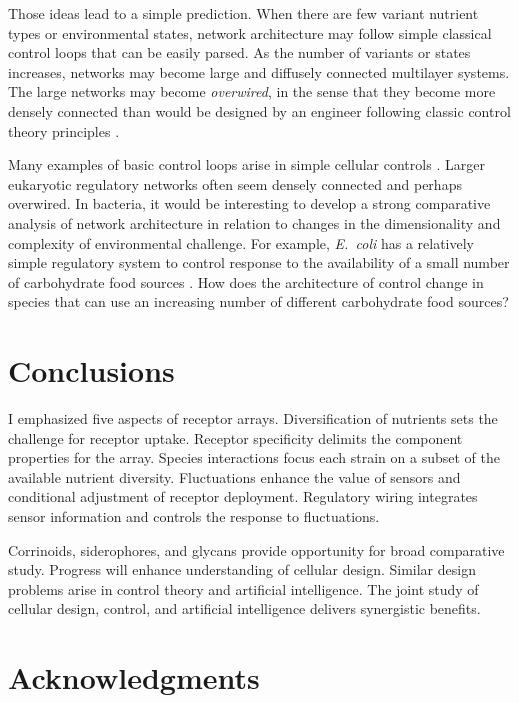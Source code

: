 \documentclass[\mydocfontsize]{article}
\begin{document}
\begin{multicols}{2}
Those ideas lead to a simple prediction. When there are few variant nutrient types or environmental states, network architecture may follow simple classical control loops that can be easily parsed. As the number of variants or states increases, networks may become large and diffusely connected multilayer systems. The large networks may become \textit{overwired}, in the sense that they become more densely connected than would be designed by an engineer following classic control theory principles \autocite{frank17puzzles5}.

Many examples of basic control loops arise in simple cellular controls \autocite{alon07an-introduction,09control,somvanshi15implementation}. Larger eukaryotic regulatory networks often seem densely connected and perhaps overwired. In bacteria, it would be interesting to develop a strong comparative analysis of network architecture in relation to changes in the dimensionality and complexity of environmental challenge. For example, \textit{E.\ coli} has a relatively simple regulatory system to control response to the availability of a small number of carbohydrate food sources \autocite{kochanowski17few-regulatory}. How does the architecture of control change in species that can use an increasing number of different carbohydrate food sources?

\section{Conclusions}

I emphasized five aspects of receptor arrays. Diversification of nutrients sets the challenge for receptor uptake. Receptor specificity delimits the component properties for the array. Species interactions focus each strain on a subset of the available nutrient diversity. Fluctuations enhance the value of sensors and conditional adjustment of receptor deployment. Regulatory wiring integrates sensor information and controls the response to fluctuations.

Corrinoids, siderophores, and glycans provide opportunity for broad comparative study. Progress will enhance understanding of cellular design. Similar design problems arise in control theory and artificial intelligence. The joint study of cellular design, control, and artificial intelligence delivers synergistic benefits. 

\section*{Acknowledgments}


\end{multicols}
\end{document}

